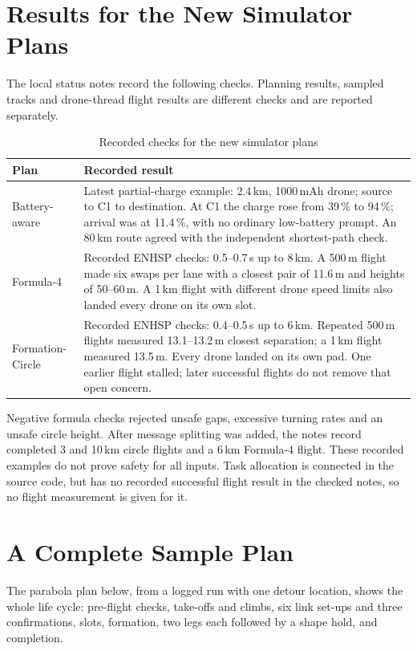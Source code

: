 \documentclass[11pt,a4paper,oneside]{report}
\begin{document}
\section{Results for the New Simulator Plans}
The local status notes record the following checks. Planning results, sampled tracks and
drone-thread flight results are different checks and are reported separately.
\begin{table}[H]
\caption{Recorded checks for the new simulator plans}\label{tab:newresults}
\small
\begin{tabularx}{\textwidth}{@{}P{0.2\textwidth}Y@{}}
\toprule
\textbf{Plan} & \textbf{Recorded result} \\
\midrule
Battery-aware & Latest partial-charge example: 2.4\,km, 1000\,mAh drone; source to C1 to
destination. At C1 the charge rose from 39\,\% to 94\,\%; arrival was at 11.4\,\%, with no
ordinary low-battery prompt. An 80\,km route agreed with the independent shortest-path check. \\
Formula-4 & Recorded ENHSP checks: 0.5--0.7\,s up to 8\,km. A 500\,m flight made six swaps per
lane with a closest pair of 11.6\,m and heights of 50--60\,m. A 1\,km flight with different
drone speed limits also landed every drone on its own slot. \\
Formation-Circle & Recorded ENHSP checks: 0.4--0.5\,s up to 6\,km. Repeated 500\,m flights
measured 13.1--13.2\,m closest separation; a 1\,km flight measured 13.5\,m. Every drone landed
on its own pad. One earlier flight stalled; later successful flights do not remove that open concern. \\
\bottomrule
\end{tabularx}
\end{table}
Negative formula checks rejected unsafe gaps, excessive turning rates and an unsafe circle
height. After message splitting was added, the notes record completed 3 and 10\,km circle
flights and a 6\,km Formula-4 flight. These recorded examples do not prove safety for all inputs.
Task allocation is connected in the source code, but has no recorded successful flight result
in the checked notes, so no flight measurement is given for it.

\section{A Complete Sample Plan}\label{sec:sampleplan}
The parabola plan below, from a logged run with one detour location, shows the whole life cycle:
pre-flight checks, take-offs and climbs, six link set-ups and three confirmations, slots,
formation, two legs each followed by a shape hold, and completion.
\end{document}
